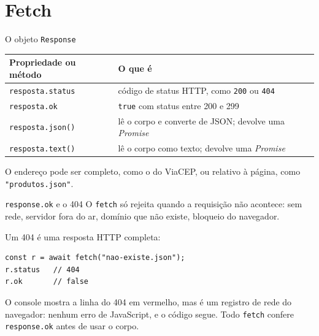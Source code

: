 \documentclass{beamer}
\begin{document}
\section{Fetch}

\begin{frame}{O objeto \texttt{Response}}
	\small
	\begin{tabular}{>{\raggedright\arraybackslash}p{}>{\raggedright\arraybackslash}p{}}
		\toprule
		Propriedade ou método & O que é \\
		\midrule
		\texttt{resposta.status} & código de status HTTP, como \texttt{200} ou
		\texttt{404} \\ \midrule
		\texttt{resposta.ok} & \texttt{true} com status entre 200 e 299 \\
		\midrule
		\texttt{resposta.json()} & lê o corpo e converte de JSON; devolve uma
		\emph{Promise} \\ \midrule
		\texttt{resposta.text()} & lê o corpo como texto; devolve uma
		\emph{Promise} \\
		\bottomrule
	\end{tabular}

	\vspace{0.3cm}
	O endereço pode ser completo, como o do ViaCEP, ou relativo à página, como
	\texttt{"produtos.json"}.
\end{frame}

\begin{frame}[fragile]{\texttt{response.ok} e o 404}
	O \texttt{fetch} só rejeita quando a requisição não acontece: sem rede,
	servidor fora do ar, domínio que não existe, bloqueio do navegador.

	\vspace{0.2cm}
	Um 404 é uma resposta HTTP completa:

	\begin{verbatim}
const r = await fetch("nao-existe.json");
r.status   // 404
r.ok       // false
	\end{verbatim}

	\vspace{0.2cm}
	O console mostra a linha do 404 em vermelho, mas é um registro de rede do
	navegador: nenhum erro de JavaScript, e o código segue. Todo
	\texttt{fetch} confere \texttt{response.ok} antes de usar o corpo.
\end{frame}
\end{document}
